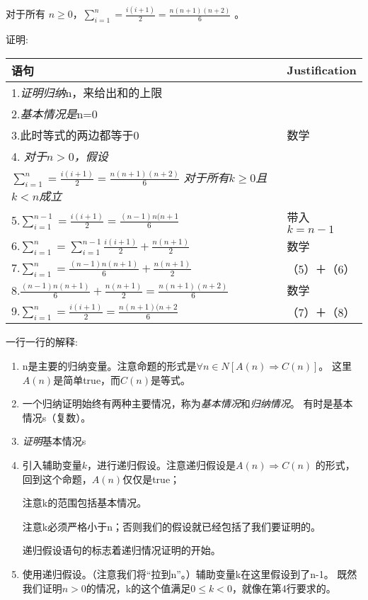 \begin{proposition}
对于所有
$n \geq 0$，$\sum\limits_{i=1}^n = \frac{i(i+1)}{2} = \frac{n(n+1)(n+2)}{6}$ 。

\noindent 证明:

\begin{tabular}{ll}
\hline
语句  &Justification \\
\hline
1.\emph{证明归纳}n，来给出和的上限 & \\
2.\emph{基本情况是}n=0    & \\
3.此时等式的两边都等于0  &数学\\
4. \emph{对于$n>0$，假设} & \\
    $\sum\limits_{i=1}^n = \frac{i(i+1)}{2} = \frac{n(n+1)(n+2)}{6}$ \emph{对于所有$k\geq 0$且$k<n$成立} & \\
5.$\sum\limits_{i=1}^{n-1} = \frac{i(i+1)}{2} = \frac{(n-1)n(n+1}{6}$  &带入$k=n-1$\\
6.$\sum\limits_{i=1}^{n} = \sum\limits_{i=1}^{n-1}\frac{i(i+1)}{2}+\frac{n(n+1)}{2}$  &数学\\
7.$\sum\limits_{i=1}^{n} = \frac{(n-1)n(n+1)}{6} + \frac{n(n+1)}{2}$  &（5）＋（6）\\
8.$\frac{(n-1)n(n+1)}{6} + \frac{n(n+1)}{2}= \frac{n(n+1)(n+2)}{6} $  &数学\\
9.$\sum\limits_{i=1}^n = \frac{i(i+1)}{2} = \frac{n(n+1)(n+2}{6}$ &（7）＋（8）\\
\hline
\end{tabular}

\vspace{2ex}
一行一行的解释:
\begin{enumerate}
\item n是主要的归纳变量。注意命题的形式是$\forall n \in N[A(n)\Rightarrow C(n)]$。
        这里$A(n)$是简单true，而$C(n)$是等式。
\item 一个归纳证明始终有两种主要情况，称为\emph{基本情况}和\emph{归纳情况}。
        有时是基本情况s（复数）。
\item \emph{证明}基本情况s
\item 引入辅助变量$k$，进行递归假设。注意递归假设是$A(n)\Rightarrow C(n)$
        的形式，回到这个命题，$A(n)$仅仅是true；

        注意k的范围包括基本情况。

        注意k必须严格小于n；否则我们的假设就已经包括了我们要证明的。

        递归假设语句的标志着递归情况证明的开始。

\item 使用递归假设。（注意我们将“拉到n”。）辅助变量k在这里假设到了n-1。
        既然我们证明$n>0$的情况，k的这个值满足$0 \leq k<0$，就像在第4行要求的。


\end{enumerate}
\end{proposition}
